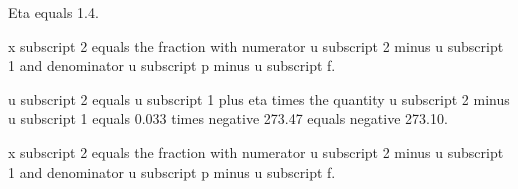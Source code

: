 Eta equals 1.4.

x subscript 2 equals the fraction with numerator u subscript 2 minus u subscript 1 and denominator u subscript p minus u subscript f.

u subscript 2 equals u subscript 1 plus eta times the quantity u subscript 2 minus u subscript 1 equals 0.033 times negative 273.47 equals negative 273.10.

x subscript 2 equals the fraction with numerator u subscript 2 minus u subscript 1 and denominator u subscript p minus u subscript f.